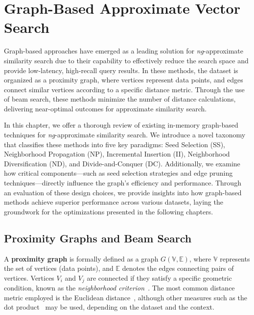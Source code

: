 \graphicspath{{../img/graph/}}
\chapter{Graph-Based Approximate Vector Search}
\label{chapter:graphfamily}

\noindent Graph-based approaches have emerged as a leading solution for \textit{ng}-approximate similarity search due to their capability to effectively reduce the search space and provide low-latency, high-recall query results. In these methods, the dataset is organized as a proximity graph, where vertices represent data points, and edges connect similar vertices according to a specific distance metric. Through the use of beam search, these methods minimize the number of distance calculations, delivering near-optimal outcomes for approximate similarity search.

In this chapter, we offer a thorough review of existing in-memory graph-based techniques for \textit{ng}-approximate similarity search. We introduce a novel taxonomy that classifies these methods into five key paradigms: Seed Selection (SS), Neighborhood Propagation (NP), Incremental Insertion (II), Neighborhood Diversification (ND), and Divide-and-Conquer (DC). Additionally, we examine how critical components—such as seed selection strategies and edge pruning techniques—directly influence the graph's efficiency and performance. Through an evaluation of these design choices, we provide insights into how graph-based methods achieve superior performance across various datasets, laying the groundwork for the optimizations presented in the following chapters. 

\clearpage 
\section{Proximity Graphs and Beam Search}
\label{sec:proximity_graphs}

A \textbf{proximity graph} is formally defined as a graph \(G(\mathbb{V}, \mathbb{E})\), where \(\mathbb{V}\) represents the set of vertices (data points), and \(\mathbb{E}\) denotes the edges connecting pairs of vertices. Vertices \(V_i\) and \(V_j\) are connected if they satisfy a specific geometric condition, known as the \textit{neighborhood criterion}~\cite{shamos1975closest}. The most common distance metric employed is the Euclidean distance~\cite{edelsbrunner87}, although other measures such as the dot product~\cite{mipsg} may be used, depending on the dataset and the context.

